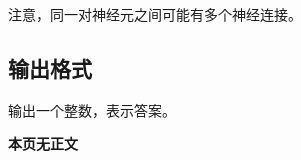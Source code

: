 注意，同一对神经元之间可能有多个神经连接。

\subsection*{输出格式}

输出一个整数，表示答案。

\setcounter{ExampleNo}{0}


\clearpage

\ifodd\value{page}
\else
    \vspace*{\fill}
    \begin{center}
    \textbf{\Large 本页无正文}
    \end{center}
    \vspace*{\fill}
    \clearpage
\fi

